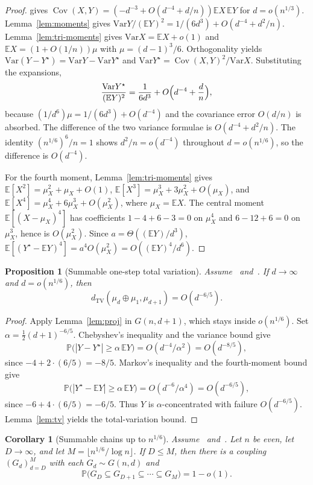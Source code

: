 \documentclass[11pt]{article}
\newtheorem{corollary}[theorem]{Corollary}
\newtheorem{proposition}[theorem]{Proposition}
\newcommand{\EE}{\mathbb{E}}
\newcommand{\PP}{\mathbb{P}}
\newcommand{\Var}{\mathrm{Var}}
\newcommand{\dTV}{d_{\mathrm{TV}}}
\begin{document}
\begin{proof}
\cite[Theorem~10]{Gao21} gives
\(\operatorname{Cov}(X,Y)=(-d^{-3}+O(d^{-4}+d/n))\EE X\,\EE Y\) for \(d=o(n^{1/3})\).
Lemma~\ref{lem:moments} gives
\(\Var Y/(\EE Y)^2=1/(6d^3)+O(d^{-4}+d^2/n)\).
Lemma~\ref{lem:tri-moments} gives \(\Var X=\EE X+o(1)\) and \(\EE X=(1+O(1/n))\mu\)
with \(\mu=(d-1)^3/6\). Orthogonality yields \(\Var(Y-Y^\star)=\Var Y-\Var Y^\star\)
and \(\Var Y^\star=\operatorname{Cov}(X,Y)^2/\Var X\). Substituting the expansions,
\[
\frac{\Var Y^\star}{(\EE Y)^2}
=
\frac1{6d^3}+O\Bigl(d^{-4}+\frac{d}{n}\Bigr),
\]
because \((1/d^6)\mu=1/(6d^3)+O(d^{-4})\) and the covariance error \(O(d/n)\) is
absorbed. The difference of the two variance formulae is \(O(d^{-4}+d^2/n)\).
The identity \((n^{1/6})^6/n=1\) shows \(d^2/n=o(d^{-4})\) throughout
\(d=o(n^{1/6})\), so the difference is \(O(d^{-4})\).

For the fourth moment, Lemma~\ref{lem:tri-moments} gives
\(\EE[X^2]=\mu_X^2+\mu_X+O(1)\),
\(\EE[X^3]=\mu_X^3+3\mu_X^2+O(\mu_X)\), and
\(\EE[X^4]=\mu_X^4+6\mu_X^3+O(\mu_X^2)\), where \(\mu_X=\EE X\).
The central moment \(\EE[(X-\mu_X)^4]\) has coefficients \(1-4+6-3=0\) on
\(\mu_X^4\) and \(6-12+6=0\) on \(\mu_X^3\), hence is \(O(\mu_X^2)\).
Since \(a=\Theta((\EE Y)/d^3)\),
\(\EE[(Y^\star-\EE Y)^4]=a^4 O(\mu_X^2)=O((\EE Y)^4/d^6)\).
\end{proof}

\begin{proposition}[Summable one-step total variation]
\label{prop:summable-step}
Assume~\cite[Theorem~6]{Gao20} and~\cite[Theorem~10]{Gao21}.
If \(d\to\infty\) and \(d=o(n^{1/6})\), then
\[
\dTV(\mu_d\oplus\mu_1,\mu_{d+1})=O(d^{-6/5}).
\]
\end{proposition}

\begin{proof}
Apply Lemma~\ref{lem:proj} in \(G(n,d+1)\), which stays inside \(o(n^{1/6})\).
Set \(\alpha=\tfrac12(d+1)^{-6/5}\). Chebyshev's inequality and the variance bound
give
\[
\PP\bigl(|Y-Y^\star|\ge\alpha\,\EE Y\bigr)
=O(d^{-4}/\alpha^2)=O(d^{-8/5}),
\]
since \(-4+2\cdot(6/5)=-8/5\). Markov's inequality and the fourth-moment bound give
\[
\PP\bigl(|Y^\star-\EE Y|\ge\alpha\,\EE Y\bigr)
=O(d^{-6}/\alpha^4)=O(d^{-6/5}),
\]
since \(-6+4\cdot(6/5)=-6/5\). Thus \(Y\) is \(\alpha\)-concentrated with failure
\(O(d^{-6/5})\). Lemma~\ref{lem:tv} yields the total-variation bound.
\end{proof}

\begin{corollary}[Summable chains up to \(n^{1/6}\)]
\label{cor:summable}
Assume~\cite[Theorem~6]{Gao20} and~\cite[Theorem~10]{Gao21}.
Let \(n\) be even, let \(D\to\infty\), and let
\(M=\lfloor n^{1/6}/\log n\rfloor\). If \(D\le M\), then there is a coupling
\((G_d)_{d=D}^{M}\) with each \(G_d\sim G(n,d)\) and
\[
\PP\bigl(G_D\subseteq G_{D+1}\subseteq\cdots\subseteq G_M\bigr)=1-o(1).
\]
\end{corollary}
\end{document}
